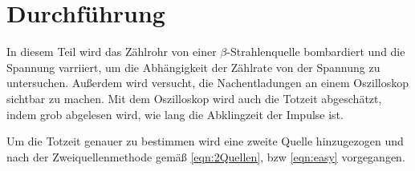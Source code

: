 \section{Durchführung}
\label{sec:Durchführung}

In diesem Teil wird das Zählrohr von einer $\beta$-Strahlenquelle bombardiert und die Spannung varriiert, um die Abhängigkeit der Zählrate von der Spannung zu untersuchen. Außerdem wird versucht, die Nachentladungen an einem Oszilloskop sichtbar zu machen. Mit dem Oszilloskop wird auch die Totzeit abgeschätzt, indem grob abgelesen wird, wie lang die Abklingzeit der Impulse ist.

Um die Totzeit genauer zu bestimmen wird  eine zweite Quelle hinzugezogen und nach der Zweiquellenmethode gemäß \eqref{eqn:2Quellen}, bzw \eqref{eqn:easy} vorgegangen.
